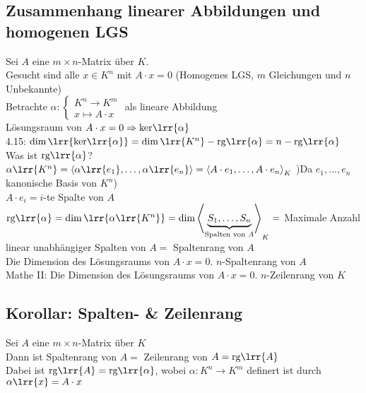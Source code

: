 \subsection{Zusammenhang linearer Abbildungen und homogenen LGS}
	Sei $A$ eine $m\times n$-Matrix über $K$.\\
	Gesucht sind alle $x\in K^n$ mit $A\cdot x=0$ (Homogenes LGS, $m$ Gleichungen und $n$ Unbekannte)\\
	Betrachte $\alpha:\begin{cases}K^n\rightarrow K^m\\x\mapsto A\cdot x\end{cases}$ als lineare Abbildung\\
	Lösungsraum von $A\cdot x=0 \Rightarrow \mbox{ker}\lrr{\alpha}$\\
	4.15: $\dim\lrr{\mbox{ker}\lrr{\alpha}}=\dim\lrr{K^n}-\mbox{rg}\lrr{\alpha}=n-\mbox{rg}\lrr{\alpha}$\\
	Was ist $\mbox{rg}\lrr{\alpha}$?\\
	$\alpha\lrr{K^n}=\left\langle\alpha\lrr{e_1},\dots,\alpha\lrr{e_n}\right\rangle=\left\langle A\cdot e_1,\dots, A\cdot e_n\right\rangle_K$ )Da $e_1,\dots,e_n$ kanonische Basis von $K^n$)\\
	$A\cdot e_i=i$-te Spalte von $A$\\
	$\mbox{rg}\lrr{\alpha}=\dim\lrr{\alpha\lrr{K^n}}=\dim\left\langle \underbrace{S_1,\dots,S_n}_{\mbox{\scriptsize Spalten von }\scriptstyle A}\right\rangle_K=$ Maximale Anzahl linear unabhängiger Spalten von $A =$ Spaltenrang von $A$\\
	Die Dimension des Lösungsraums von $A\cdot x=0$. $n$-Spaltenrang von $A$\\
	Mathe II: Die Dimension des Lösungsraums von $A\cdot x=0$. $n$-Zeilenrang von $K$

\subsection{Korollar: Spalten- \& Zeilenrang}
	Sei $A$ eine $m\times n$-Matrix über $K$\\
	Dann ist Spaltenrang von $A =$ Zeilenrang von $A=\mbox{rg}\lrr{A}$\\
	Dabei ist $\mbox{rg}\lrr{A}=\mbox{rg}\lrr{\alpha}$, wobei $\alpha:K^n\rightarrow K^m$ definert ist durch $\alpha\lrr{x}=A\cdot x$
